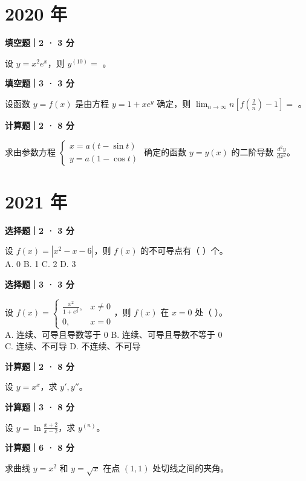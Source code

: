 

\section*{2020 年}


\textbf{填空题｜2 · 3 分}

设 $y = x^2e^x$，则 $y^{(10)} = $ \underline{\hspace{3cm}}。


\textbf{填空题｜3 · 3 分}

设函数 $y = f(x)$ 是由方程 $y = 1 + xe^y$ 确定，则 $\lim_{n\to\infty} n \left[ f \left(\frac{2}{n}\right) - 1 \right] = $ \underline{\hspace{3cm}}。


\textbf{计算题｜2 · 8 分}

求由参数方程 $\begin{cases} x = a(t - \sin t) \\ y = a(1 - \cos t) \end{cases}$ 确定的函数 $y = y(x)$ 的二阶导数 $\frac{d^2y}{dx^2}$。


\section*{2021 年}


\textbf{选择题｜2 · 3 分}

设 $f(x) = |x^2 - x - 6|$，则 $f(x)$ 的不可导点有（ \quad ）个。\\
A. 0 \quad B. 1 \quad C. 2 \quad D. 3


\textbf{选择题｜3 · 3 分}

设 $f(x) = \begin{cases} \frac{x^2}{1+e^{\frac{1}{x}}}, & x \neq 0 \\ 0, & x = 0 \end{cases}$，则 $f(x)$ 在 $x = 0$ 处（ \quad ）。\\
A. 连续、可导且导数等于 0 \quad B. 连续、可导且导数不等于 0\\
C. 连续、不可导 \quad D. 不连续、不可导


\textbf{计算题｜2 · 8 分}

设 $y = x^x$，求 $y', y''$。


\textbf{计算题｜3 · 8 分}

设 $y = \ln\frac{x+2}{x-2}$，求 $y^{(n)}$。


\textbf{计算题｜6 · 8 分}

求曲线 $y = x^2$ 和 $y = \sqrt{x}$ 在点 $(1, 1)$ 处切线之间的夹角。


